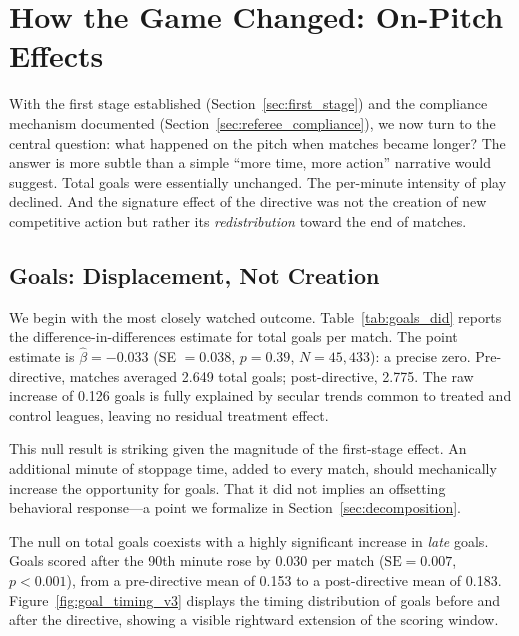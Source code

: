 
\section{How the Game Changed: On-Pitch Effects}
\label{sec:on_pitch}

With the first stage established (Section~\ref{sec:first_stage}) and the compliance mechanism documented (Section~\ref{sec:referee_compliance}), we now turn to the central question: what happened on the pitch when matches became longer?  The answer is more subtle than a simple ``more time, more action'' narrative would suggest.  Total goals were essentially unchanged.  The per-minute intensity of play declined.  And the signature effect of the directive was not the creation of new competitive action but rather its \emph{redistribution} toward the end of matches.

\subsection{Goals: Displacement, Not Creation}
\label{sec:goals}

We begin with the most closely watched outcome.  Table~\ref{tab:goals_did} reports the difference-in-differences estimate for total goals per match.  The point estimate is $\hat{\beta} = -0.033$ (SE $= 0.038$, $p = 0.39$, $N = 45{,}433$): a precise zero.  Pre-directive, matches averaged 2.649 total goals; post-directive, 2.775.  The raw increase of 0.126 goals is fully explained by secular trends common to treated and control leagues, leaving no residual treatment effect.

This null result is striking given the magnitude of the first-stage effect.  An additional minute of stoppage time, added to every match, should mechanically increase the opportunity for goals.  That it did not implies an offsetting behavioral response---a point we formalize in Section~\ref{sec:decomposition}.

The null on total goals coexists with a highly significant increase in \emph{late} goals.  Goals scored after the 90th minute rose by 0.030 per match ($\text{SE} = 0.007$, $p < 0.001$), from a pre-directive mean of 0.153 to a post-directive mean of 0.183.  Figure~\ref{fig:goal_timing_v3} displays the timing distribution of goals before and after the directive, showing a visible rightward extension of the scoring window.

